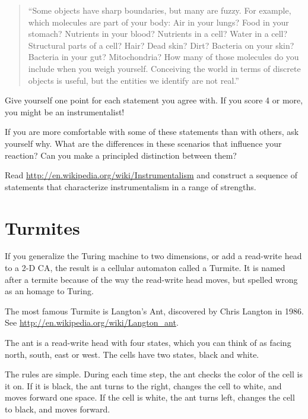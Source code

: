 \documentclass[10pt]{book}
\begin{document}
\begin{quote}
``Some objects have sharp boundaries, but many are fuzzy.  For
  example, which molecules are part of your body: Air in your lungs?
  Food in your stomach?  Nutrients in your blood?  Nutrients in a
  cell?  Water in a cell?  Structural parts of a cell?  Hair?  Dead
  skin?  Dirt?  Bacteria on your skin?  Bacteria in your gut?
  Mitochondria?  How many of those molecules do you include when you
  weigh yourself.  Conceiving the world in terms of discrete objects
  is useful, but the entities we identify are not real.''
\end{quote}

Give yourself one point for each statement you agree with.
If you score 4 or more, you might be an instrumentalist!

If you are more comfortable with some of these statements than with
others, ask yourself why.  What are the differences in these
scenarios that influence your reaction?  Can you make
a principled distinction between them?

\begin{ex}

Read \url{http://en.wikipedia.org/wiki/Instrumentalism}
and construct a sequence
of statements that characterize instrumentalism in a range of
strengths.

\end{ex}


\section{Turmites}

If you generalize the Turing machine to two dimensions, or
add a read-write head to a 2-D CA, the result is a
cellular automaton called a Turmite.  It is named after a
termite because of the way the read-write head moves, but
spelled wrong as an homage to Turing. 

The most famous Turmite is Langton's Ant, discovered by Chris Langton
in 1986.  See \url{http://en.wikipedia.org/wiki/Langton_ant}.

The ant is a read-write head with
four states, which you can think of as facing north, south,
east or west.  The cells have two states, black and white.

The rules are simple.  During each time step, the ant checks the color
of the cell is it on.  If it is black, the ant turns to the right,
changes the cell to white, and moves forward one space.  If the cell
is white, the ant turns left, changes the cell to black, and moves
forward.
\end{document}
